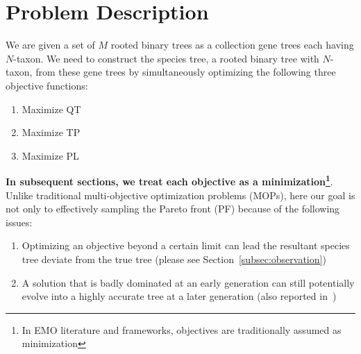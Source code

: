 \section{Problem Description}
\label{sec:problem}
We are given a set of $M$ rooted binary trees as a collection gene trees each having $N$-taxon. We need to construct the species tree, a rooted binary tree with $N$-taxon, from these gene trees by simultaneously optimizing the following three objective functions:  
\begin{enumerate}[label=$F_\arabic*$)]		
	\item Maximize QT 
	\item Maximize TP
	\item Maximize PL 
\end{enumerate}
\textbf{In subsequent sections, we treat each objective as a minimization\footnote{In EMO literature and frameworks, objectives are traditionally assumed as minimization}}. Unlike traditional multi-objective optimization problems (MOPs), here our goal is not only to effectively sampling the Pareto front (PF) because of the following issues:
\begin{enumerate}[label=$I_\arabic*$]
	\item \label{item:i1} Optimizing an objective beyond a certain limit can lead the resultant species tree deviate from the true tree (please see Section~\ref{subsec:observation})
	\item \label{item:i2} A solution that is badly dominated at an early generation can still potentially evolve into a highly accurate tree at a later generation (also reported in~\cite{qu2010multi})
\end{enumerate}

